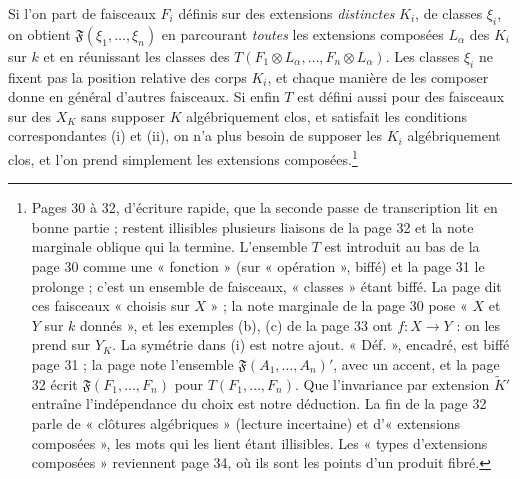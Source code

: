 \documentclass[11pt,a4paper]{article}
\begin{document}
Si l'on part de faisceaux $F_i$ définis sur des extensions \emph{distinctes}
$K_i$, de classes $\xi_i$, on obtient $\mathfrak{F}(\xi_1, \ldots, \xi_n)$
en parcourant \emph{toutes} les extensions composées $L_\alpha$ des $K_i$
sur $k$ et en réunissant les classes des
$T(F_1 \otimes L_\alpha, \ldots, F_n \otimes L_\alpha)$. Les classes $\xi_i$
ne fixent pas la position relative des corps $K_i$, et chaque manière de
les composer donne en général d'autres faisceaux. Si enfin $T$ est défini
aussi pour des faisceaux sur des $X_K$ sans supposer $K$ algébriquement
clos, et satisfait les conditions correspondantes (i) et (ii), on n'a plus
besoin de supposer les $K_i$ algébriquement clos, et l'on prend simplement
les extensions composées.\footnote{Pages 30 à 32, d'écriture rapide, que la
seconde passe de transcription lit en bonne partie ; restent illisibles
plusieurs liaisons de la page 32 et la note marginale oblique qui la
termine. L'ensemble $T$ est introduit au bas de la page 30 comme une
« fonction » (sur « opération », biffé) et la page 31 le prolonge ; c'est un
ensemble de faisceaux, « classes » étant biffé. La page dit ces faisceaux
« choisis sur $X$ » ; la note marginale de la page 30 pose « $X$ et $Y$ sur
$k$ donnés », et les exemples (b), (c) de la page 33 ont $f : X \to Y$ :
on les prend sur $Y_K$. La symétrie dans (i) est notre ajout. « Déf. »,
encadré, est biffé page 31 ; la page note l'ensemble
$\mathfrak{F}(A_1, \ldots, A_n)'$, avec un accent, et la page 32 écrit
$\mathfrak{F}(F_1, \ldots, F_n)$ pour $T(F_1, \ldots, F_n)$. Que
l'invariance par extension $\widetilde{K}'$ entraîne l'indépendance du choix
est notre déduction. La fin de la page 32 parle de « clôtures algébriques »
(lecture incertaine) et d'« extensions composées », les mots qui les lient
étant illisibles. Les « types d'extensions composées » reviennent page 34,
où ils sont les points d'un produit fibré.}
\end{document}
